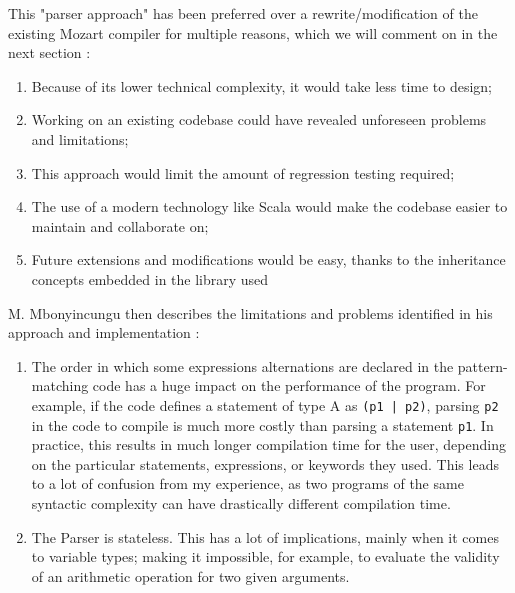 This "parser approach" has been preferred over a rewrite/modification of the existing Mozart compiler for multiple reasons, which we will comment on in the next section :
\begin{enumerate}
    \item Because of its lower technical complexity, it would take less time to design;
    \item Working on an existing codebase could have revealed unforeseen problems and limitations;
    \item This approach would limit the amount of regression testing required;
    \item The use of a modern technology like Scala would make the codebase easier to maintain and collaborate on;
    \item Future extensions and modifications would be easy, thanks to the inheritance concepts embedded in the library used
\end{enumerate}
M. Mbonyincungu then describes the limitations and problems identified in his approach and implementation :
\begin{enumerate}[resume]
    \item The order in which some expressions alternations are declared in the pattern-matching code has a huge impact on the performance of the program.
    For example, if the code defines a statement of type A as \texttt{(p1 | p2)}, parsing \texttt{p2} in the code to compile is much more costly than parsing a statement \texttt{p1}.
    In practice, this results in much longer compilation time for the user, depending on the particular statements, expressions, or keywords they used.
    This leads to a lot of confusion from my experience, as two programs of the same syntactic complexity can have drastically different compilation time.
    \item The Parser is stateless.
    This has a lot of implications, mainly when it comes to variable types;
    making it impossible, for example, to evaluate the validity of an arithmetic operation for two given arguments.
\end{enumerate}

